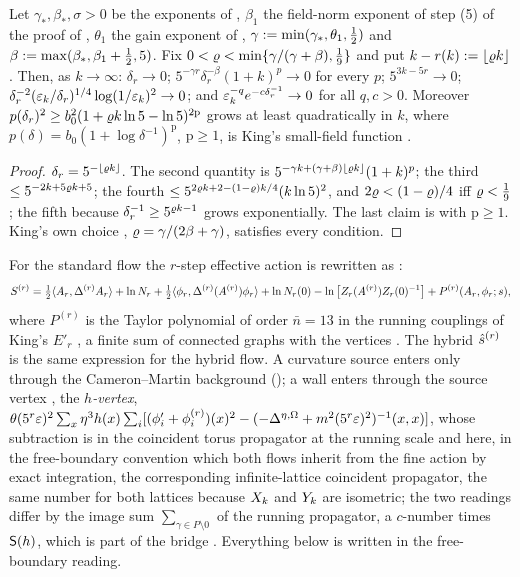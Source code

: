 \begin{lemma}\label{rot:lem:r}
Let $\gamma_*,\beta_*,\sigma>0$ be the exponents of \cite[Thm.~3.4]{K1}, $\beta_1$ the field-norm exponent of step (5) of the proof of , $\theta_1$ the gain exponent of , $\gamma:=\min(\gamma_*,\theta_1,\frac12)$ and $\beta:=\max(\beta_*,\beta_1+\frac12,5)$. Fix $0<\varrho<\min\{\gamma/(\gamma+\beta),\frac19\}$ and put $k-r(k):=\lfloor\varrho k\rfloor$. Then, as $k\to\infty$: $\delta_r\to0$; $5^{-\gamma r}\delta_r^{-\beta}(1+k)^p\to0$ for every $p$; $5^{3k-5r}\to0$; $\delta_r^{-2}(\varepsilon_k/\delta_r)^{1/4}\log(1/\varepsilon_k)^2\to0$; and $\varepsilon_k^{-q}e^{-c\delta_r^{-1}}\to0$ for all $q,c>0$. Moreover $p(\delta_r)^2\ge b_0^2(1+\varrho k\ln5-\ln5)^{2\mathrm p}$ grows at least quadratically in $k$, where $p(\delta)=b_0(1+\log\delta^{-1})^{\mathrm p}$, $\mathrm p\ge1$, is King's small-field function \cite[(3.1)]{K1}.
\end{lemma}
\begin{proof}
$\delta_r=5^{-\lfloor\varrho k\rfloor}$. The second quantity is $5^{-\gamma k+(\gamma+\beta)\lfloor\varrho k\rfloor}(1+k)^p$; the third $\le5^{-2k+5\varrho k+5}$; the fourth $\le5^{2\varrho k+2-(1-\varrho)k/4}(k\ln5)^2$, and $2\varrho<(1-\varrho)/4$ iff $\varrho<\frac19$; the fifth because $\delta_r^{-1}\ge5^{\varrho k-1}$ grows exponentially. The last claim is \cite[(3.1)]{K1} with $\mathrm p\ge1$. King's own choice \cite[(3.12)]{K1}, $\varrho=\gamma/(2\beta+\gamma)$, satisfies every condition.
\end{proof}

\begin{definition}\label{rot:def:eff}
For the standard flow the $r$-step effective action is \cite[(3.14)]{K1} rewritten as \cite[(3.90)]{K1}:
\[
S^{(r)}=\tfrac12\langle A_r,\Delta^{(r)}A_r\rangle+\ln N_r+\tfrac12\langle \phi_r,\Delta^{(r)}(A^{(r)})\phi_r\rangle+\ln N_r(0)-\ln\big[Z_r(A^{(r)})Z_r(0)^{-1}\big]+P^{(r)}(A_r,\phi_r;s),
\]
where $P^{(r)}$ is the Taylor polynomial of order $\bar n=13$ in the running couplings of King's $E'_r$ \cite[(3.17)]{K1}, a finite sum of connected graphs with the vertices \cite[(3.18)--(3.26)]{K1}. The hybrid $\hat s^{(r)}$ is the same expression for the hybrid flow. A curvature source enters only through the Cameron--Martin background (); a wall enters through the source vertex \cite[(3.21)]{K1}, the \emph{$h$-vertex}, $\theta(5^r\varepsilon)^2\sum_x\eta^3h(x)\sum_i[(\phi'_i+\phi^{(r)}_i)(x)^2-(-\Delta^{\eta,\Omega}+m^2(5^r\varepsilon)^2)^{-1}(x,x)]$, whose subtraction is in \cite{K1} the coincident torus propagator at the running scale and here, in the free-boundary convention which both flows inherit from the fine action by exact integration, the corresponding infinite-lattice coincident propagator, the same number for both lattices because $X_k$ and $Y_k$ are isometric; the two readings differ by the image sum $\sum_{\gamma\in P\setminus0}$ of the running propagator, a $c$-number times $\mathsf S(h)$, which is part of the bridge . Everything below is written in the free-boundary reading.
\end{definition}


